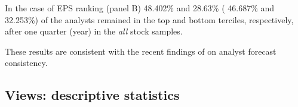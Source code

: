\documentclass{article}\usepackage[]{graphicx}\usepackage[]{color}
\newcommand{\all}{\textit{all}}
\begin{document}
In the case of EPS ranking  (panel B) 48.402\% and  28.63\% ( 46.687\% and  32.253\%) of the analysts  remained in the top and bottom terciles, respectively,  after one quarter (year) in the \all{} stock samples.

These results are consistent with the recent findings of \cite{hilary2013} on analyst forecast consistency. 






\subsection{Views: descriptive statistics}
\end{document}
